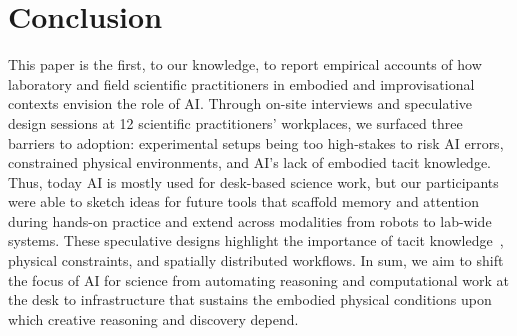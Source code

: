 \section{Conclusion}

This paper is the first, to our knowledge, to report empirical accounts of how laboratory and field scientific practitioners in embodied and improvisational contexts envision the role of AI. Through on-site interviews and speculative design sessions at 12 scientific practitioners' workplaces, we surfaced three barriers to adoption: experimental setups being too high-stakes to risk AI errors, constrained physical environments, and AI's lack of embodied tacit knowledge. Thus, today AI is mostly used for desk-based science work, but our participants were able to sketch ideas for future tools that scaffold memory and attention during hands-on practice and extend across modalities from robots to lab-wide systems. These speculative designs highlight the importance of tacit knowledge~\cite{polanyi2009tacit}, physical constraints, and spatially distributed workflows. In sum, we aim to shift the focus of AI for science from automating reasoning and computational work at the desk to infrastructure that sustains the embodied physical conditions upon which creative reasoning and discovery depend.
